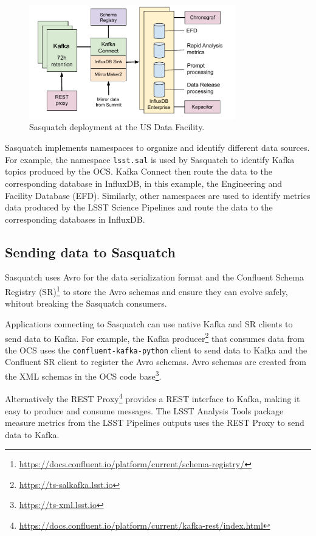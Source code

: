 \begin{figure}[h]
    \centering
    \includegraphics[width=0.8\textwidth]{figures/sasquatch-architecture.pdf}
    \caption{Sasquatch deployment at the US Data Facility.}
    \label{fig:system-architecture}

\end{figure}

Sasquatch implements namespaces to organize and identify different data sources. For example, the namespace \texttt{lsst.sal} is used by Sasquatch to identify Kafka topics produced by the OCS. Kafka Connect then route the data to the corresponding database in InfluxDB, in this example, the Engineering and Facility Database (EFD). Similarly, other namespaces are used to identify metrics data produced by the LSST Science Pipelines and route the data to the corresponding databases in InfluxDB.

\subsection{Sending data to Sasquatch}

Sasquatch uses Avro for the data serialization format and the Confluent Schema Registry (SR)\footnote{\url{https://docs.confluent.io/platform/current/schema-registry/}} to store the Avro schemas and ensure they can evolve safely, whitout breaking the Sasquatch consumers.

Applications connecting to Sasquatch can use native Kafka and SR clients to send data to Kafka. For example, the Kafka producer\footnote{\url{https://ts-salkafka.lsst.io}} that consumes data from the OCS uses the \texttt{confluent-kafka-python} client to send data to Kafka and the Confluent SR client to register the Avro schemas. Avro schemas are created from the XML schemas in the OCS code base\footnote{\url{https://ts-xml.lsst.io}}.

Alternatively the REST Proxy\footnote{\url{https://docs.confluent.io/platform/current/kafka-rest/index.html}} provides a REST interface to Kafka, making it easy to produce and consume messages. The LSST Analysis Tools package measure metrics from the LSST Pipelines outputs uses the REST Proxy to send data to Kafka.

